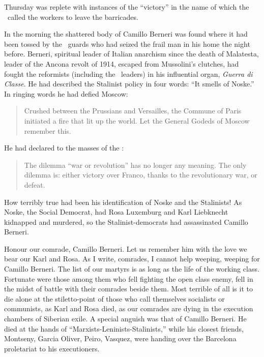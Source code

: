 \dinkus

Thursday was replete with instances of the ``victory'' in the name of which the \POUM\ called the workers to leave the barricades.

In the morning the shattered body of Camillo Berneri was found where it had been tossed by the \PSUC\ guards who had seized the frail man in his home the night before. Berneri, spiritual leader of Italian anarchism since the death of Malatesta, leader of the Ancona revolt of 1914, escaped from Mussolini’s clutches, had fought the reformists (including the \CNT\ leaders) in his influential organ, \emph{Guerra di Classe}. He had described the Stalinist policy in four words: ``It smells of Noske.'' In ringing words he had defied Moscow:

\begin{quotation}
  Crushed between the Prussians and Versailles, the Commune of Paris initiated a fire that lit up the world. Let the General Godeds of Moscow remember this.  
\end{quotation}
He had declared to the masses of the \CNT:

\begin{quotation}
  The dilemma “war or revolution” has no longer any meaning. The only dilemma is: either victory over Franco, thanks to the revolutionary war, or defeat.
\end{quotation}

How terribly true had been his identification of Noske and the Stalinists! As Noske, the Social Democrat, had Rosa Luxemburg and Karl Liebknecht kidnapped and murdered, so the Stalinist-democrats had assassinated Camillo Berneri.
 
Honour our comrade, Camillo Berneri. Let us remember him with the love we bear our Karl and Rosa. As I write, comrades, I cannot help weeping, weeping for Camillo Berneri. The list of our martyrs is as long as the life of the working class. Fortunate were those among them who fell fighting the open class enemy, fell in the midst of battle with their comrades beside them. Most terrible of all is it to die alone at the stiletto-point of those who call themselves socialists or communists, as Karl and Rosa died, as our comrades are dying in the execution chambers of Siberian exile. A special anguish was that of Camillo Berneri. He died at the hands of ``Marxists-Leninists-Stalinists,'' while his closest friends, Montseny, Garcia Oliver, Peiro, Vasquez, were handing over the Barcelona proletariat to his executioners.
 
